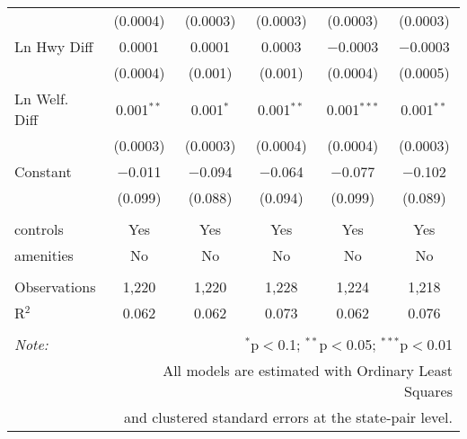 \begin{table}[!htbp]
\begin{tabular}{@{\extracolsep{5pt}}lccccc}
  & (0.0004) & (0.0003) & (0.0003) & (0.0003) & (0.0003) \\ 
  Ln Hwy Diff & 0.0001 & 0.0001 & 0.0003 & $-$0.0003 & $-$0.0003 \\ 
  & (0.0004) & (0.001) & (0.001) & (0.0004) & (0.0005) \\ 
  Ln Welf. Diff & 0.001$^{**}$ & 0.001$^{*}$ & 0.001$^{**}$ & 0.001$^{***}$ & 0.001$^{**}$ \\ 
  & (0.0003) & (0.0003) & (0.0004) & (0.0004) & (0.0003) \\ 
  Constant & $-$0.011 & $-$0.094 & $-$0.064 & $-$0.077 & $-$0.102 \\ 
  & (0.099) & (0.088) & (0.094) & (0.099) & (0.089) \\ 
 \hline \\[-1.8ex] 
controls & Yes & Yes & Yes & Yes & Yes \\ 
amenities & No & No & No & No & No \\ 
\hline \\[-1.8ex] 
Observations & 1,220 & 1,220 & 1,228 & 1,224 & 1,218 \\ 
R$^{2}$ & 0.062 & 0.062 & 0.073 & 0.062 & 0.076 \\ 
\hline 
\hline \\[-1.8ex] 
\textit{Note:}  & \multicolumn{5}{r}{$^{*}$p$<$0.1; $^{**}$p$<$0.05; $^{***}$p$<$0.01} \\ 
 & \multicolumn{5}{r}{All models are estimated with Ordinary Least Squares} \\ 
 & \multicolumn{5}{r}{and clustered standard errors at the state-pair level.} \\ 
\end{tabular} 
\end{table} 
